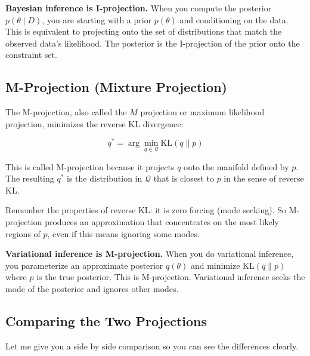 \vspace{1em}

\textbf{Bayesian inference is I-projection.} When you compute the posterior $p(\theta \mid D)$, you are starting with a prior $p(\theta)$ and conditioning on the data. This is equivalent to projecting onto the set of distributions that match the observed data's likelihood. The posterior is the I-projection of the prior onto the constraint set.

\vspace{1.5em}

\subsection{M-Projection (Mixture Projection)}

The M-projection, also called the $M$ projection or maximum likelihood projection, minimizes the reverse KL divergence:

\begin{equation}
q^* = \arg\min_{q \in \mathcal{Q}} \text{KL}(q \| p)
\end{equation}

This is called M-projection because it projects $q$ onto the manifold defined by $p$. The resulting $q^*$ is the distribution in $\mathcal{Q}$ that is closest to $p$ in the sense of reverse KL.

\vspace{1em}

Remember the properties of reverse KL: it is zero forcing (mode seeking). So M-projection produces an approximation that concentrates on the most likely regions of $p$, even if this means ignoring some modes.

\vspace{1em}

\textbf{Variational inference is M-projection.} When you do variational inference, you parameterize an approximate posterior $q(\theta)$ and minimize $\text{KL}(q \| p)$ where $p$ is the true posterior. This is M-projection. Variational inference seeks the mode of the posterior and ignores other modes.

\vspace{1.5em}

\subsection{Comparing the Two Projections}

Let me give you a side by side comparison so you can see the differences clearly.

